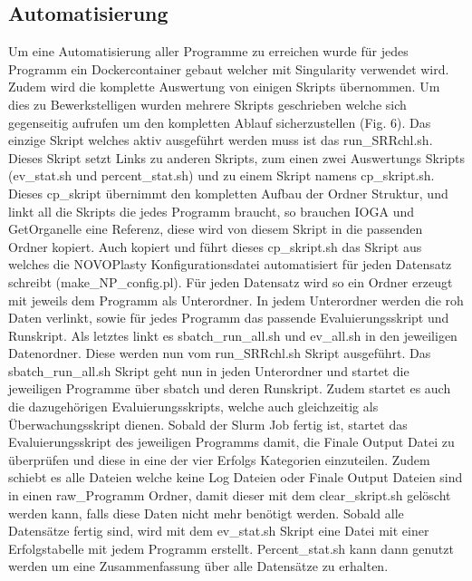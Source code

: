 \documentclass{scrartcl}
\begin{document}
\subsection{Automatisierung}
\label{sec-4-1}
Um eine Automatisierung aller Programme zu erreichen wurde für jedes Programm ein Dockercontainer gebaut welcher mit Singularity verwendet wird. Zudem wird die komplette Auswertung von einigen Skripts 
übernommen. Um dies zu Bewerkstelligen wurden mehrere Skripts geschrieben welche sich gegenseitig aufrufen um den kompletten Ablauf sicherzustellen (Fig. 6). 
Das einzige Skript welches aktiv ausgeführt werden muss ist das run\_SRRchl.sh. Dieses Skript setzt Links zu anderen Skripts, zum einen zwei Auswertungs Skripts (ev\_stat.sh und percent\_stat.sh) und
zu einem Skript namens cp\_skript.sh. Dieses cp\_skript übernimmt den kompletten Aufbau der Ordner Struktur, und linkt all die Skripts die jedes Programm braucht, so brauchen IOGA und GetOrganelle
eine Referenz, diese wird von diesem Skript in die passenden Ordner kopiert. Auch kopiert und führt dieses cp\_skript.sh das Skript aus welches die NOVOPlasty Konfigurationsdatei automatisiert für jeden
Datensatz schreibt (make\_NP\_config.pl). Für jeden Datensatz wird so ein Ordner erzeugt mit jeweils dem Programm als Unterordner. In jedem Unterordner werden die roh Daten verlinkt, sowie für jedes Programm
das passende Evaluierungsskript und Runskript. Als letztes linkt es sbatch\_run\_all.sh und ev\_all.sh in den jeweiligen Datenordner. Diese werden nun vom run\_SRRchl.sh Skript ausgeführt. Das sbatch\_run\_all.sh
Skript geht nun in jeden Unterordner und startet die jeweiligen Programme über sbatch und deren Runskript. Zudem startet es auch die dazugehörigen Evaluierungsskripts, welche auch gleichzeitig als Überwachungsskript 
dienen. Sobald der Slurm Job fertig ist, startet das Evaluierungsskript des jeweiligen Programms damit, die Finale Output Datei zu überprüfen und diese in eine der vier Erfolgs Kategorien einzuteilen. Zudem
schiebt es alle Dateien welche keine Log Dateien oder Finale Output Dateien sind in einen raw\_Programm Ordner, damit dieser mit dem clear\_skript.sh gelöscht werden kann, falls diese Daten nicht mehr benötigt werden.
Sobald alle Datensätze fertig sind, wird mit dem ev\_stat.sh Skript eine Datei mit einer Erfolgstabelle mit jedem Programm erstellt. Percent\_stat.sh kann dann genutzt werden um eine Zusammenfassung über alle Datensätze 
zu erhalten.
\end{document}
